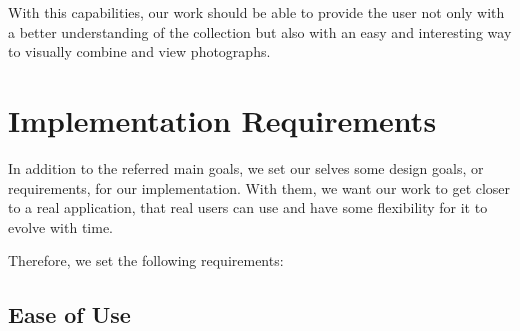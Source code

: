 With this capabilities, our work should be able to provide the user not only with a better understanding of the collection but also with an easy and interesting way to visually combine and view photographs.















\section{Implementation Requirements} %
\label{s:Implementation_Requirements}

In addition to the referred main goals, we set our selves some design goals, or requirements, for our implementation. With them, we want our work to get closer to a real application, that real users can use and have some flexibility for it to evolve with time.

Therefore, we set the following requirements:

\subsection{Ease of Use} %
\label{ssub:ease_of_use}

